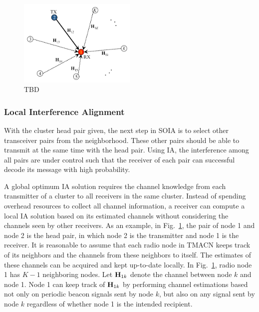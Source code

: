 \documentclass[letterpaper,11pt]{article}
\begin{document}
\begin{figure}[h]
\begin{center}
\includegraphics[width=0.5\textwidth]{../figures/InterferenceAlignment_1.png}
\caption{TBD}
\label{fig:IA_SingleRx}
\end{center}
\end{figure}

\subsubsection{Local Interference Alignment}

With the cluster head pair given, the next step in SOIA is to select other transceiver pairs from the neighborhood. These other pairs should be able to transmit at the same time with the head pair. Using IA, the interference among all pairs are under control such that the receiver of each pair can successful decode its message with high probability. 

A global optimum IA solution requires the channel knowledge from each transmitter of a cluster to all receivers in the same cluster. Instead of spending overhead resources to collect all channel information, a receiver can compute a local IA solution based on its estimated channels without considering the channels seen by other receivers. As an example, in Fig.~\ref{fig:IA_SingleRx}, the pair of node 1 and node 2 is the head pair, in which node 2 is the transmitter and node 1 is the receiver. It is reasonable to assume that each radio node in TMACN keeps track of its neighbors and the channels from these neighbors to itself. The estimates of these channels can be acquired and kept up-to-date locally. In Fig.~\ref{fig:IA_SingleRx},  radio node 1 has $K-1$ neighboring nodes. Let ${\bf{H}}_{1k}$ denote the channel between node $k$ and node 1. Node 1 can keep track of ${\bf{H}}_{1k}$ by performing channel estimations based not only on periodic beacon signals sent by node $k$, but also on any signal sent by node $k$ regardless of whether node 1 is the intended recipient. 
\end{document}
